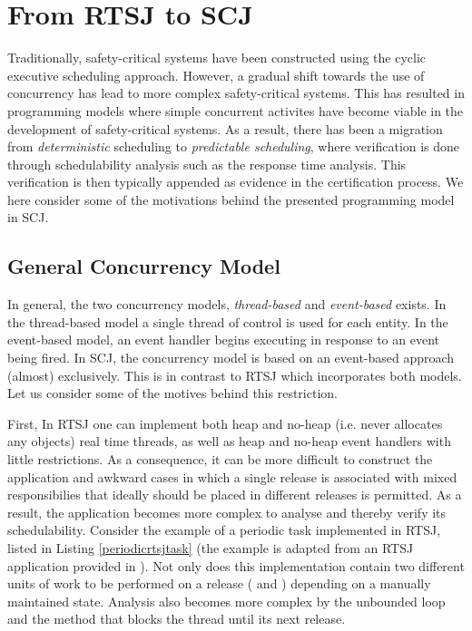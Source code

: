 \section{From RTSJ to SCJ}
\label{section:scjreflecton}
Traditionally, safety-critical systems have been constructed using the cyclic executive scheduling approach. However, a gradual shift towards the use of concurrency has lead to more complex safety-critical systems. This has resulted in programming models where simple concurrent activites have become viable in the development of safety-critical systems. As a result, there has been a migration from \textit{deterministic} scheduling to \textit{predictable scheduling}, where verification is done through schedulability analysis such as the response time analysis. This verification is then typically appended as evidence in the certification process. We here consider some of the motivations behind the presented programming model in SCJ.

\subsection{General Concurrency Model} %
In general, the two concurrency models, \textit{thread-based} and \textit{event-based} exists. In the thread-based model a single thread of control is used for each entity. In the event-based model, an event handler begins executing in response to an event being fired. In SCJ, the concurrency model is based on an event-based approach (almost) exclusively. This is in contrast to RTSJ which incorporates both models. Let us consider some of the motives behind this restriction.

First, In RTSJ one can implement both heap and no-heap (i.e. never allocates any objects) real time threads, as well as heap and no-heap event handlers with little restrictions. As a consequence, it can be more difficult to construct the application and awkward cases in which a single release is associated with mixed responsibilies that ideally should be placed in different releases is permitted. As a result, the application becomes more complex to analyse and thereby verify its schedulability. Consider the example of a periodic task implemented in RTSJ, listed in Listing \ref{periodicrtsjtask} (the example is adapted from an RTSJ application provided in \cite{Schoeberl:2007:GCS:1288940.1288953}). Not only does this implementation contain two different units of work to be performed on a release ( and ) depending on a manually maintained state. Analysis also becomes more complex by the unbounded loop and the  method that blocks the thread until its next release.

